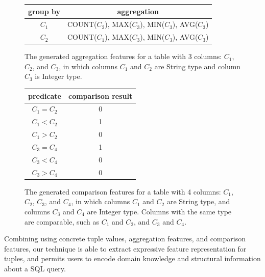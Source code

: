 \vspace{1mm}



\begin{figure}[t]
	\begin{center}
		\begin{tabular}{|c|c|}
		\hline
		\textbf{group by}	& \textbf{aggregation} \\
		\hline
		$C_1$ 				& \textsf{COUNT}($C_2$), \textsf{MAX}($C_3$), \textsf{MIN}($C_3$), \textsf{AVG}($C_3$)\\
		$C_2$ 				& \textsf{COUNT}($C_1$), \textsf{MAX}($C_3$), \textsf{MIN}($C_3$), \textsf{AVG}($C_3$)\\
		\hline
		\end{tabular}
	\end{center}
	\caption{The generated aggregation features for
a table with 3 columns:  $C_1$, $C_2$, and $C_3$, in which
columns $C_1$ and $C_2$ are \textsf{String} type and column $C_3$ is
\textsf{Integer} type.}
	\label{tbl:agg}
\end{figure}



\begin{figure}[t]
	\begin{center}
		\begin{tabular}{|c|c|}
		\hline
		\textbf{predicate}	& \textbf{comparison result} \\
		\hline
		$C_1=C_2$ 			& 0\\
		$C_1<C_2$ 			& 1\\
		$C_1>C_2$			& 0\\
		\hline
		$C_3=C_4$ 			& 1\\
		$C_3<C_4$ 			& 0\\
		$C_3>C_4$			& 0\\
		\hline
		\end{tabular}
	\end{center}
	\caption{The generated comparison features
for a table with 4 columns: $C_1$, $C_2$, $C_3$,
and $C_4$, in which columns $C_1$ and $C_2$ are \textsf{String} type, and
columns $C_3$ and $C_4$ are \textsf{Integer} type. Columns with
the same type are comparable, such as $C_1$ and $C_2$, and
$C_3$ and $C_4$.
}
	\label{tbl:com}
\end{figure}

Combining using concrete tuple values, aggregation
features, and comparison features, our technique is able to
extract expressive feature representation for tuples,
and permits users to encode domain knowledge and structural
information about a SQL query.

